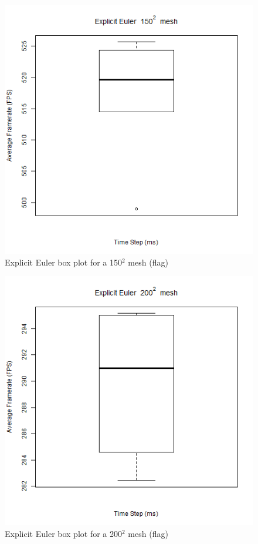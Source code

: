      \begin{figure}
    \begin{center}
      \includegraphics[scale=.9]{Figures/flag_ee_150_box}
    \end{center}
    \caption{Explicit Euler box plot for a 150$^{2}$ mesh (flag)}
    \label{fig:ee box 150 flag}
  \end{figure}
  
      \begin{figure}
    \begin{center}
      \includegraphics[scale=.9]{Figures/flag_ee_200_box}
    \end{center}
    \caption{Explicit Euler box plot for a 200$^{2}$ mesh (flag)}
    \label{fig:ee box 200 flag}
  \end{figure}
  
